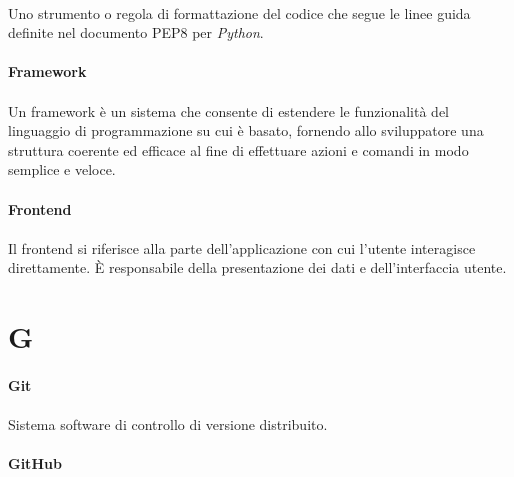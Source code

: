 \documentclass[10pt, a4paper]{article}
\begin{document}
\paragraph{}Uno strumento o regola di formattazione del codice che segue le linee guida definite nel documento PEP8 per \textit{Python\pg}.


\vspace{2em}
\paragraph{Framework}\noindent\hrulefill
\paragraph{}Un framework è un sistema che consente di estendere le funzionalità del linguaggio di programmazione su cui è basato, fornendo allo sviluppatore una struttura coerente ed efficace al fine di effettuare azioni e comandi in modo semplice e veloce.

\vspace{2em}
\paragraph{Frontend}\noindent\hrulefill
\paragraph{}Il frontend si riferisce alla parte dell'applicazione con cui l'utente interagisce direttamente. È responsabile della presentazione dei dati e dell'interfaccia utente.

\newpage
\section{G}
\vspace{2em}
\paragraph{Git}\noindent\hrulefill
\paragraph{}Sistema software di controllo di versione distribuito.

\vspace{2em}
\paragraph{GitHub}\noindent\hrulefill
\end{document}
